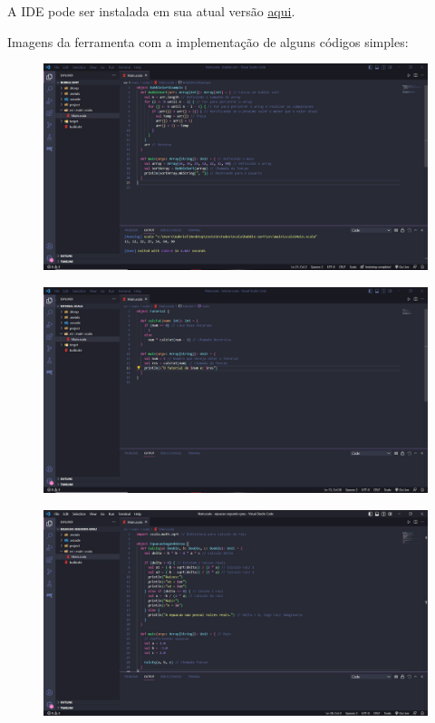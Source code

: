 	A IDE pode ser instalada em sua atual versão \href{https://code.visualstudio.com}{aqui}.

	Imagens da ferramenta com a implementação de alguns códigos simples:
	
	\begin{figure}[H]
		\centering
		\includegraphics[width=17.5cm]{Pictures/Ferr1.1.jpg}
		\caption{}
		\label{fig:ferr1}
	\end{figure}
	
	\begin{figure}[H]
		\centering
		\includegraphics[width=17.5cm]{Pictures/Ferr1.2.jpg}
		\caption{}
		\label{fig:ferr2}
	\end{figure}

	\begin{figure}[H]
		\centering
		\includegraphics[width=17.5cm]{Pictures/Ferr1.3.jpg}
		\caption{}
		\label{fig:ferr3}
	\end{figure}

